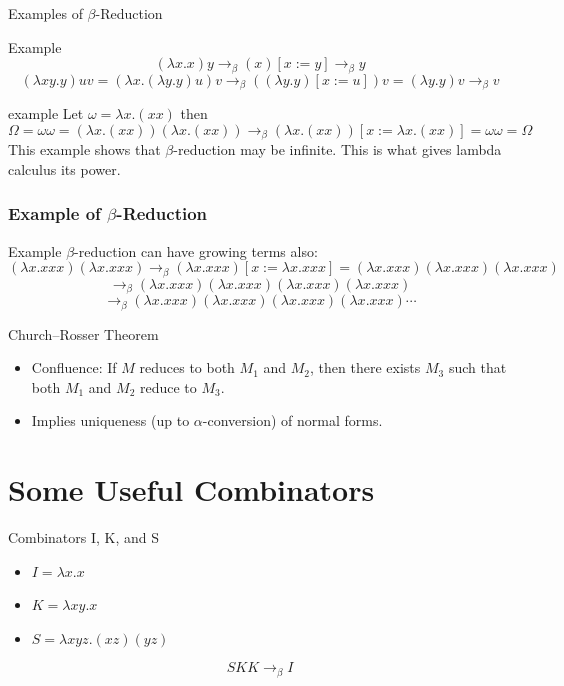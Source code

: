 \documentclass{beamer}
\begin{document}
\begin{frame}{Examples of $\beta$-Reduction}
  \begin{block}{Example}
    \[
      (\lambda x.x) y \rightarrow_\beta (x)[x := y] \rightarrow_\beta y
    \]
    \[
      (\lambda xy.y)uv = (\lambda x.(\lambda y.y)u)v \rightarrow_\beta ((\lambda y.y)[x:=u])v = (\lambda y.y)v \rightarrow_\beta v 
    \]
  \end{block}
  \begin{block}{example}
    Let \(\omega = \lambda x.(xx)\) then
    \[
      \Omega = \omega \omega = (\lambda x.(xx))(\lambda x.(xx)) \rightarrow_\beta (\lambda x.(xx))[x := \lambda x.(xx)] = \omega\omega =\Omega
    \]
    This example shows that \(\beta\)-reduction may be infinite. This is what gives lambda calculus its power.
  \end{block}
\end{frame}

\begin{frame}
  \frametitle{Example of $\beta$-Reduction}

  \begin{block}{Example}
    \(\beta\)-reduction can have growing terms also:
    \[
      (\lambda x.xxx)(\lambda x.xxx) \rightarrow_\beta (\lambda x.xxx)[x := \lambda x.xxx] = (\lambda x.xxx)(\lambda x.xxx)(\lambda x.xxx)
    \]
    \[
      \rightarrow_\beta (\lambda x.xxx)(\lambda x.xxx)(\lambda x.xxx)(\lambda x.xxx)
    \]
    \[
      \rightarrow_\beta (\lambda x.xxx)(\lambda x.xxx)(\lambda x.xxx)(\lambda x.xxx)\cdots
    \]
  \end{block}
\end{frame}

\begin{frame}{Church–Rosser Theorem}
  \begin{itemize}
    \item Confluence: If \( M \) reduces to both \( M_1 \) and \( M_2 \), then there exists \( M_3 \) such that both \( M_1 \) and \( M_2 \) reduce to \( M_3 \).
    \item Implies uniqueness (up to $\alpha$-conversion) of normal forms.
  \end{itemize}
\end{frame}

\section{Some Useful Combinators}
\begin{frame}{Combinators I, K, and S}
  \begin{itemize}
    \item \( I = \lambda x.x \)
    \item \( K = \lambda xy.x \)
    \item \( S = \lambda xyz. (xz)(yz) \)
  \end{itemize}
  \vspace{1em}
  \[
    SKK \rightarrow_\beta I
  \]
\end{frame}
\end{document}
